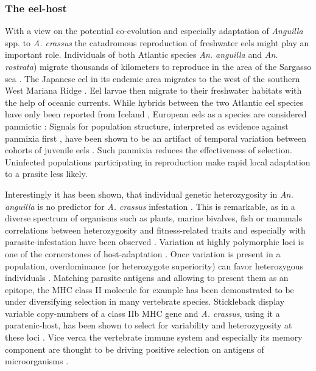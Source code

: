 \subsubsection{The eel-host}
\label{sec:eel-host}

With a view on the potential co-evolution and especially adaptation of
\textit{Anguilla} spp. to \textit{A. crassus} the catadromous
reproduction of freshwater eels might play an important
role. Individuals of both Atlantic species \textit{An. anguilla} and
\textit{An. rostrata}) migrate thousands of kilometers to reproduce in
the area of the Sargasso sea \cite{pmid19779192}. The Japanese eel in
its endemic area migrates to the west of the southern West Mariana
Ridge \cite{pmid20735676}. Eel larvae then migrate to their freshwater
habitats with the help of oceanic currents. While hybrids between the
two Atlantic eel species have only been reported from Iceland
\cite{pmid21299662}, European eels as a species are considered
panmictic \cite{pmid20735687}: Signals for population structure,
interpreted as evidence against panmixia first \cite{pmid11234011},
have been shown to be an artifact of temporal variation between
cohorts of juvenile eels \cite{pmid19417764, pmid21299662,
  pmid16024374}. Such panmixia reduces the effectiveness of
selection. Uninfected populations participating in reproduction make
rapid local adaptation to a prasite less likely.

Interestingly it has been shown, that individual genetic
heterozygosity in \textit{An. anguilla} is no predictor for
\textit{A. crassus} infestation \cite{pmid19840264}. This is
remarkable, as in a diverse spectrum of organisms such as plants,
marine bivalves, fish or mammals correlations between heterozygosity
and fitness-related traits and especially with parasite-infestation
have been observed \cite{pmid16262866,pmid18398424}. Variation at
highly polymorphic loci is one of the cornerstones of host-adaptation
\cite{pmid20078764}. Once variation is present in a population,
overdominance (or heterozygote superiority) can favor heterozygous
individuals \cite{pmid19129114,pmid17603099}. Matching parasite
antigens and allowing to present them as an epitope, the MHC class II
molecule for example has been demonstrated to be under diversifying
selection in many vertebrate species. Stickleback display variable
copy-numbers of a class IIb MHC gene and \textit{A. crassus}, using it
a paratenic-host, has been shown to select for variability and
heterozygosity at these loci \cite{wegner_parasite_2003}. Vice verca
the vertebrate immune system and especially its memory component are
thought to be driving positive selection on antigens of microorganisms
\cite{conway_measuring_2002}.

